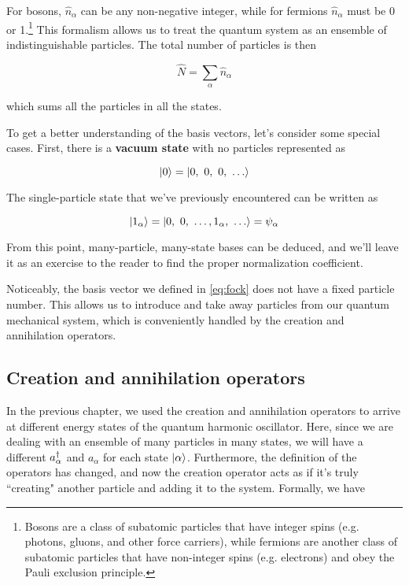 For bosons, $\hat{n}_{\alpha}$ can be any non-negative integer, while for fermions $\hat{n}_{\alpha}$ must be 0 or 1.\footnote{Bosons are a class of subatomic particles that have integer spins (e.g. photons, gluons, and other force carriers), while fermions are another class of subatomic particles that have non-integer spins (e.g. electrons) and obey the Pauli exclusion principle.} 
This formalism allows us to treat the quantum system as an ensemble of indistinguishable particles. 
The total number of particles is then

\begin{equation}
	\hat{N} = \sum_{\alpha} \hat{n}_{\alpha}
\end{equation}

\noindent which sums all the particles in all the states.

To get a better understanding of the basis vectors, let's consider some special cases. 
First, there is a \textbf{vacuum state} with no particles represented as

\begin{equation}
	\ket{0} = \ket{0,\ 0,\ 0,\ \dots}
\end{equation}

The single-particle state that we've previously encountered can be written as

\begin{equation}
	\ket{1_{\alpha}} = \ket{0,\ 0,\ \dots, 1_{\alpha},\ \dots} = \psi_{\alpha}
\end{equation}

From this point, many-particle, many-state bases can be deduced, and we'll leave it as an exercise to the reader to find the proper normalization coefficient.

Noticeably, the basis vector we defined in \autoref{eq:fock} does not have a fixed particle number. 
This allows us to introduce and take away particles from our quantum mechanical system, which is conveniently handled by the creation and annihilation operators.


\subsection{Creation and annihilation operators}

In the previous chapter, we used the creation and annihilation operators to arrive at different energy states of the quantum harmonic oscillator. 
Here, since we are dealing with an ensemble of many particles in many states, we will have a different $a^{\dagger}_{\alpha}$ and $a_{\alpha}$ for each state $\ket{\alpha}$. 
Furthermore, the definition of the operators has changed, and now the creation operator acts as if it's truly ``creating" another particle and adding it to the system. 
Formally, we have

